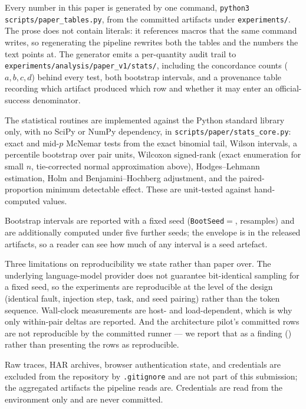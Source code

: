 Every number in this paper is generated by one command,
\texttt{python3 scripts/paper\_tables.py}, from the committed artifacts under
\texttt{experiments/}. The prose does not contain literals: it references macros
that the same command writes, so regenerating the pipeline rewrites both the
tables and the numbers the text points at. The generator emits a per-quantity
audit trail to \texttt{experiments/analysis/paper\_v1/stats/}, including the
concordance counts ($a,b,c,d$) behind every test, both bootstrap intervals, and a
provenance table recording which artifact produced which row and whether it may
enter an official-success denominator.

The statistical routines are implemented against the Python standard library
only, with no SciPy or NumPy dependency, in \texttt{scripts/paper/stats\_core.py}:
exact and mid-$p$ McNemar tests from the exact binomial tail, Wilson intervals,
a percentile bootstrap over pair units, Wilcoxon signed-rank (exact enumeration
for small $n$, tie-corrected normal approximation above), Hodges--Lehmann
estimation, Holm and Benjamini--Hochberg adjustment, and the paired-proportion
minimum detectable effect. These are unit-tested against hand-computed values.

Bootstrap intervals are reported with a fixed seed
(\texttt{BootSeed}$=$\BootSeed{}, \BootIters{} resamples) and are additionally
computed under five further seeds; the envelope is in the released artifacts,
so a reader can see how much of any interval is a seed artefact.

Three limitations on reproducibility we state rather than paper over. The
underlying language-model provider does not guarantee bit-identical sampling for a
fixed seed, so the experiments are reproducible at the level of the design
(identical fault, injection step, task, and seed pairing) rather than the token
sequence. Wall-clock measurements are host- and load-dependent, which is why only
within-pair deltas are reported. And the architecture pilot's committed rows are
not reproducible by the committed runner --- we report that as a finding
() rather than presenting the rows as reproducible.

Raw traces, HAR archives, browser authentication state, and credentials are
excluded from the repository by \texttt{.gitignore} and are not part of this
submission; the aggregated artifacts the pipeline reads are. Credentials are read
from the environment only and are never committed.
